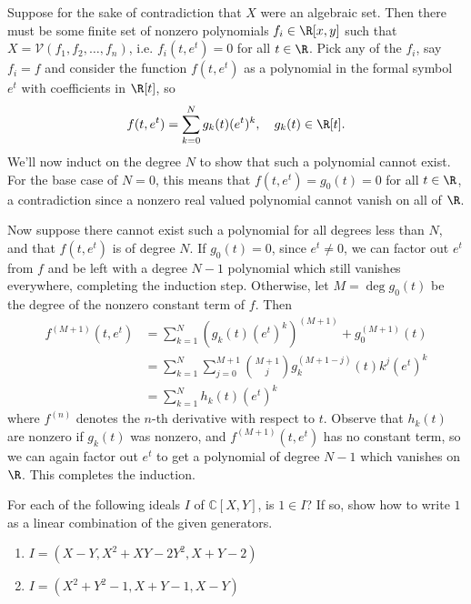 \documentclass[11pt,letterpaper]{article}
\begin{document}
\begin{solution}
    Suppose for the sake of contradiction that $X$ were an algebraic set. Then there must be some finite set of nonzero polynomials $f_i\in \R[x,y]$ such that $X=\mathcal{V}(f_1,f_2,\ldots,f_n)$, i.e. $f_i(t, e^t)=0$ for all $t\in \R$. Pick any of the $f_i$, say $f_i=f$ and consider the function $f(t,e^t)$ as a polynomial in the formal symbol $e^t$ with coefficients in $\R[t]$, so
    \[
        f(t,e^t)=\sum_{k=0}^N g_k(t)(e^t)^k,\quad g_k(t)\in \R[t]
    .\]        
    We'll now induct on the degree $N$ to show that such a polynomial cannot exist. For the base case of $N=0$, this means that $f(t,e^t)=g_0(t)=0$ for all $t\in \R$, a contradiction since a nonzero real valued polynomial cannot vanish on all of $\R$. 
    
    Now suppose there cannot exist such a polynomial for all degrees less than $N$, and that $f(t,e^t)$ is of degree $N$. If $g_0(t)=0$, since $e^t\neq 0$, we can factor out $e^t$ from $f$ and be left with a degree $N-1$ polynomial which still vanishes everywhere, completing the induction step. Otherwise, let $M=\deg g_0(t)$ be the degree of the nonzero constant term of $f$.  Then
    \[
        \begin{aligned}
            f^{(M+1)}(t,e^t)&=\sum^N_{k=1}\left(g_k(t)(e^t)^k\right)^{(M+1)}+g^{(M+1)}_0(t)\\
            &=\sum^N_{k=1}\sum^{M+1}_{j=0}\binom{M+1}{j}g^{(M+1-j)}_k(t)k^j(e^t)^k\\
            &=\sum^N_{k=1}h_k(t)(e^t)^k
        \end{aligned}
    \]
    where $f^{(n)}$ denotes the $n$-th derivative with respect to $t$. Observe that $h_k(t)$ are nonzero if $g_k(t)$ was nonzero, and $f^{(M+1)}(t,e^t)$ has no constant term, so we can again factor out $e^t$ to get a polynomial of degree $N-1$ which vanishes on $\R$. This completes the induction.      
\end{solution}

\begin{problem}
    For each of the following ideals $I$ of $\mathbb C[X,Y]$, is $1\in I$? If so, show how to write $1$ as a linear combination of the given generators.
    \begin{enumerate}[label=\alph*)]
        \item $I=(X-Y, X^2 + XY - 2Y^2, X + Y - 2)$
        \item $I=(X^2 + Y^2 - 1, X + Y - 1, X - Y)$
    \end{enumerate}
\end{problem}
\end{document}
